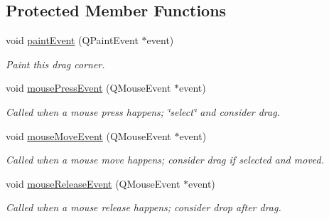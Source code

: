 \subsection*{Protected Member Functions}
\begin{DoxyCompactItemize}
\item 
void \hyperlink{classProjectorDragCorner_ae46fbe25f41c58ace7fc80e740844fea}{paint\+Event} (Q\+Paint\+Event $\ast$event)\hypertarget{classProjectorDragCorner_ae46fbe25f41c58ace7fc80e740844fea}{}\label{classProjectorDragCorner_ae46fbe25f41c58ace7fc80e740844fea}

\begin{DoxyCompactList}\small\item\em Paint this drag corner. \end{DoxyCompactList}\item 
void \hyperlink{classProjectorDragCorner_a5880fbfba1b683f639aea5e316982ea2}{mouse\+Press\+Event} (Q\+Mouse\+Event $\ast$event)\hypertarget{classProjectorDragCorner_a5880fbfba1b683f639aea5e316982ea2}{}\label{classProjectorDragCorner_a5880fbfba1b683f639aea5e316982ea2}

\begin{DoxyCompactList}\small\item\em Called when a mouse press happens; \char`\"{}select\char`\"{} and consider drag. \end{DoxyCompactList}\item 
void \hyperlink{classProjectorDragCorner_a445cbdf85c5ed49f0c14aec203533a80}{mouse\+Move\+Event} (Q\+Mouse\+Event $\ast$event)\hypertarget{classProjectorDragCorner_a445cbdf85c5ed49f0c14aec203533a80}{}\label{classProjectorDragCorner_a445cbdf85c5ed49f0c14aec203533a80}

\begin{DoxyCompactList}\small\item\em Called when a mouse move happens; consider drag if selected and moved. \end{DoxyCompactList}\item 
void \hyperlink{classProjectorDragCorner_a6e29b9a308b04e87081d94176f682309}{mouse\+Release\+Event} (Q\+Mouse\+Event $\ast$event)\hypertarget{classProjectorDragCorner_a6e29b9a308b04e87081d94176f682309}{}\label{classProjectorDragCorner_a6e29b9a308b04e87081d94176f682309}

\begin{DoxyCompactList}\small\item\em Called when a mouse release happens; consider drop after drag. \end{DoxyCompactList}\end{DoxyCompactItemize}

